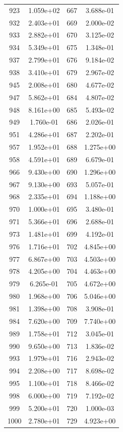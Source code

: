\documentclass[12pt]{article}
\begin{document}
\begin{longtable}{@{}cccc@{}}
923 & 1.059e+02 & 667 & 3.688e-01 \\
932 & 2.403e+01 & 669 & 2.000e-02 \\
933 & 2.882e+01 & 670 & 3.125e-02 \\
934 & 5.349e+01 & 675 & 1.348e-01 \\
937 & 2.799e+01 & 676 & 9.184e-02 \\
938 & 3.410e+01 & 679 & 2.967e-02 \\
945 & 2.008e+01 & 680 & 4.677e-02 \\
947 & 5.862e+01 & 684 & 4.807e-02 \\
948 & 8.161e+00 & 685 & 5.493e-02 \\
949 & 1.760e-01 & 686 & 2.026e-01 \\
951 & 4.286e+01 & 687 & 2.202e-01 \\
957 & 1.952e+01 & 688 & 1.275e+00 \\
958 & 4.591e+01 & 689 & 6.679e-01 \\
966 & 9.430e+00 & 690 & 1.296e+00 \\
967 & 9.130e+00 & 693 & 5.057e-01 \\
968 & 2.335e+01 & 694 & 1.188e+00 \\
970 & 1.000e+01 & 695 & 3.480e-01 \\
971 & 5.366e+01 & 696 & 2.688e-01 \\
973 & 1.481e+01 & 699 & 4.192e-01 \\
976 & 1.716e+01 & 702 & 4.845e+00 \\
977 & 6.867e+00 & 703 & 4.503e+00 \\
978 & 4.205e+00 & 704 & 4.463e+00 \\
979 & 6.265e-01 & 705 & 4.672e+00 \\
980 & 1.968e+00 & 706 & 5.046e+00 \\
981 & 1.398e+00 & 708 & 3.908e-01 \\
984 & 7.620e+00 & 709 & 7.740e+00 \\
989 & 1.758e+01 & 712 & 3.045e-01 \\
990 & 9.650e+00 & 713 & 1.836e-02 \\
993 & 1.979e+01 & 716 & 2.943e-02 \\
994 & 2.208e+00 & 717 & 8.698e-02 \\
995 & 1.100e+01 & 718 & 8.466e-02 \\
998 & 6.000e+00 & 719 & 7.192e-02 \\
999 & 5.200e+01 & 720 & 1.000e-03 \\
1000 & 2.780e+01 & 729 & 4.923e+00 \\

\end{longtable}
\end{document}

